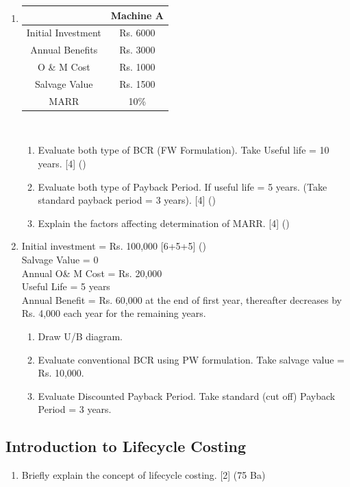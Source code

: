 \documentclass[12pt]{article}
\begin{document}
\begin{enumerate}[noitemsep, topsep = 0pt]
		\item \begin{tabular}{|c|c|}
			\hline
			& Machine A \\ \hline
			Initial Investment & Rs. 6000 \\ \hline
			Annual Benefits & Rs. 3000 \\ \hline
			O \& M Cost & Rs. 1000 \\ \hline
			Salvage Value & Rs. 1500 \\ \hline
			MARR & 10\% \\ \hline
		\end{tabular}\\[0pt]
		\begin{enumerate}[noitemsep, topsep = 0pt, label = \alph*.]
			\item Evaluate both type of BCR (FW Formulation). Take Useful life = 10 years. \hfill [4] ()
			\item Evaluate both type of Payback Period. If useful life = 5 years. (Take standard payback period = 3 years). \hfill [4] ()
			\item Explain the factors affecting determination of MARR. \hfill [4] ()
		\end{enumerate}
		
		\item Initial investment = Rs. 100,000 \hfill [6+5+5] ()\\
		Salvage Value = 0\\
		Annual O\& M Cost = Rs. 20,000\\
		Useful Life = 5 years\\
		Annual Benefit = Rs. 60,000 at the end of first year, thereafter decreases by Rs. 4,000 each year for the remaining years.
		\begin{enumerate}[noitemsep, topsep = 0pt, label = \alph*.]
			\item Draw U/B diagram.
			\item Evaluate conventional BCR using PW formulation. Take salvage value = Rs. 10,000.
			\item Evaluate Discounted Payback Period. Take standard (cut off) Payback Period = 3 years.
		\end{enumerate}
	\end{enumerate}

	\subsection{Introduction to Lifecycle Costing}
	\begin{enumerate}[noitemsep, topsep = 0pt]
		\item Briefly explain the concept of lifecycle costing. \hfill [2] (75 Ba)
	\end{enumerate}
\end{document}
